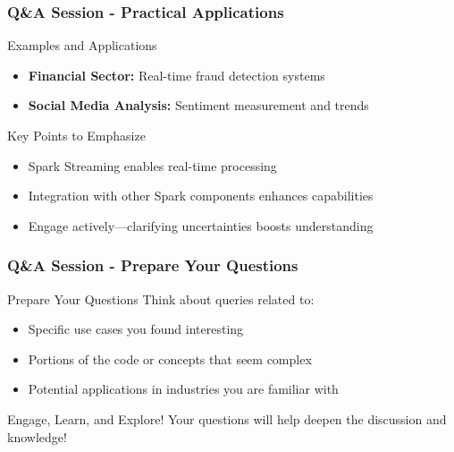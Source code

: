 \documentclass[aspectratio=169]{beamer}
\begin{document}
\begin{frame}[fragile]
    \frametitle{Q\&A Session - Practical Applications}
    \begin{block}{Examples and Applications}
        \begin{itemize}
            \item \textbf{Financial Sector:} Real-time fraud detection systems
            \item \textbf{Social Media Analysis:} Sentiment measurement and trends
        \end{itemize}
    \end{block}
    \begin{block}{Key Points to Emphasize}
        \begin{itemize}
            \item Spark Streaming enables real-time processing
            \item Integration with other Spark components enhances capabilities
            \item Engage actively—clarifying uncertainties boosts understanding
        \end{itemize}
    \end{block}
\end{frame}

\begin{frame}[fragile]
    \frametitle{Q\&A Session - Prepare Your Questions}
    \begin{block}{Prepare Your Questions}
        Think about queries related to:
        \begin{itemize}
            \item Specific use cases you found interesting
            \item Portions of the code or concepts that seem complex
            \item Potential applications in industries you are familiar with
        \end{itemize}
    \end{block}
    \begin{block}{Engage, Learn, and Explore!}
        Your questions will help deepen the discussion and knowledge!
    \end{block}
\end{frame}
\end{document}

